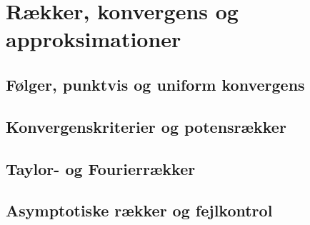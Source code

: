 \chapter{Rækker, konvergens og approksimationer}
\section{Følger, punktvis og uniform konvergens}
\leavevmode\par

\section{Konvergenskriterier og potensrækker}
\leavevmode\par

\section{Taylor- og Fourierrækker}
\leavevmode\par

\section{Asymptotiske rækker og fejlkontrol}
\leavevmode\par
